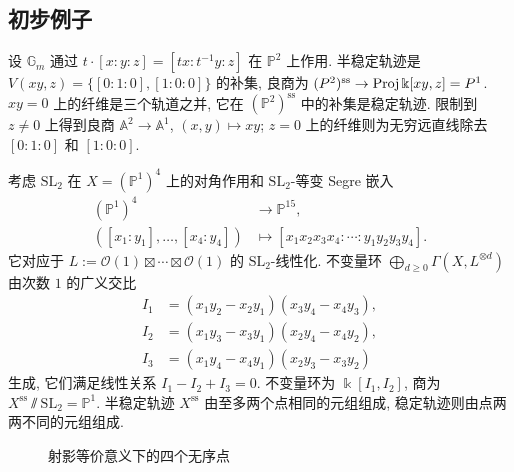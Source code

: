 \subsection{初步例子}\label{src:8.2.3-subsection}
\begin{example}\label{src:8.2.7}
设 $\mathbb G_m$ 通过 $t\cdot[x:y:z]=[tx:t^{-1}y:z]$ 在 $\mathbb P^2$ 上作用. 半稳定轨迹是 $V(xy,z)=\{[0:1:0],[1:0:0]\}$ 的补集, 良商为 $(P^2)^{\mathrm{ss}}\to\operatorname{Proj}\Bbbk[xy,z]=P^1$. $xy=0$ 上的纤维是三个轨道之并, 它在 $(\mathbb P^2)^{\mathrm{ss}}$ 中的补集是稳定轨迹. 限制到 $z\ne0$ 上得到良商 $\mathbb A^2\to\mathbb A^1$, $(x,y)\mapsto xy$; $z=0$ 上的纤维则为无穷远直线除去 $[0:1:0]$ 和 $[1:0:0]$.
\end{example}
\begin{example}\label{src:8.2.8}
考虑 $\mathrm{SL}_2$ 在 $X=(\mathbb P^1)^4$ 上的对角作用和 $\mathrm{SL}_2$-等变 Segre 嵌入
\[
\begin{aligned}
(\mathbb P^1)^4&\longrightarrow\mathbb P^{15},\\
([x_1:y_1],\ldots,[x_4:y_4])&\longmapsto[x_1x_2x_3x_4:\cdots:y_1y_2y_3y_4].
\end{aligned}
\]
它对应于 $L:=\mathcal O(1)\boxtimes\cdots\boxtimes\mathcal O(1)$ 的 $\mathrm{SL}_2$-线性化. 不变量环 $\bigoplus_{d\geq0}\Gamma(X,L^{\otimes d})$ 由次数 $1$ 的广义交比
\begin{align*}
I_1&=(x_1y_2-x_2y_1)(x_3y_4-x_4y_3),\\
I_2&=(x_1y_3-x_3y_1)(x_2y_4-x_4y_2),\\
I_3&=(x_1y_4-x_4y_1)(x_2y_3-x_3y_2)
\end{align*}
生成, 它们满足线性关系 $I_1-I_2+I_3=0$. 不变量环为 $\Bbbk[I_1,I_2]$, 商为 $X^{\mathrm{ss}}\sslash\mathrm{SL}_2=\mathbb P^1$. 半稳定轨迹 $X^{\mathrm{ss}}$ 由至多两个点相同的元组组成, 稳定轨迹则由点两两不同的元组组成.
\end{example}
\begin{figure}[H]
\centering
{}
\qquad
{}
\par\medskip
{}
\caption{射影等价意义下的四个无序点}\label{src:8.2.9}
\end{figure}
